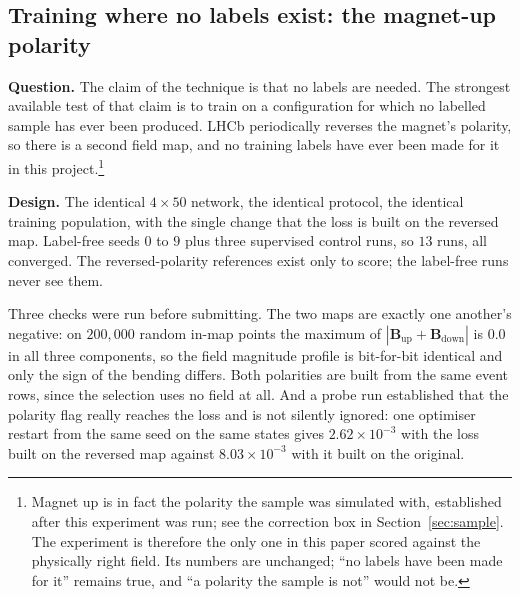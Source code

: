 \documentclass[11pt,a4paper]{article}
\begin{document}
\subsection{Training where no labels exist: the magnet-up polarity}
\label{sec:magnetup}

\textbf{Question.} The claim of the technique is that no labels are needed. The
strongest available test of that claim is to train on a configuration for which
no labelled sample has ever been produced. LHCb periodically reverses the
magnet's polarity, so there is a second field map, and no training labels have
ever been made for it in this project.\footnote{Magnet up is in fact the
polarity the sample was simulated with, established after this experiment was
run; see the correction box in Section~\ref{sec:sample}. The experiment is
therefore the only one in this paper scored against the physically right field.
Its numbers are unchanged; ``no labels have been made for it'' remains true, and
``a polarity the sample is not'' would not be.}

\textbf{Design.} The identical $4 \times 50$ network, the identical protocol,
the identical training population, with the single change that the loss is built
on the reversed map. Label-free seeds $0$ to $9$ plus three supervised control
runs, so $13$ runs, all converged. The reversed-polarity references exist only
to score; the label-free runs never see them.

Three checks were run before submitting. The two maps are exactly one another's
negative: on $200{,}000$ random in-map points the maximum of
$|\mathbf{B}_{\mathrm{up}} + \mathbf{B}_{\mathrm{down}}|$ is $0.0$ in all three
components, so the field magnitude profile is bit-for-bit identical and only the
sign of the bending differs. Both polarities are built from the same event rows,
since the selection uses no field at all. And a probe run established that the
polarity flag really reaches the loss and is not silently ignored: one optimiser
restart from the same seed on the same states gives $2.62 \times 10^{-3}$ with
the loss built on the reversed map against $8.03 \times 10^{-3}$ with it built
on the original.
\end{document}
